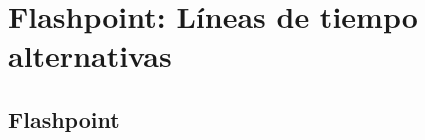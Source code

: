 %
%
\chapter{Flashpoint: Líneas de tiempo alternativas}

\Blindtext

\section{Flashpoint}

\Blindtext
